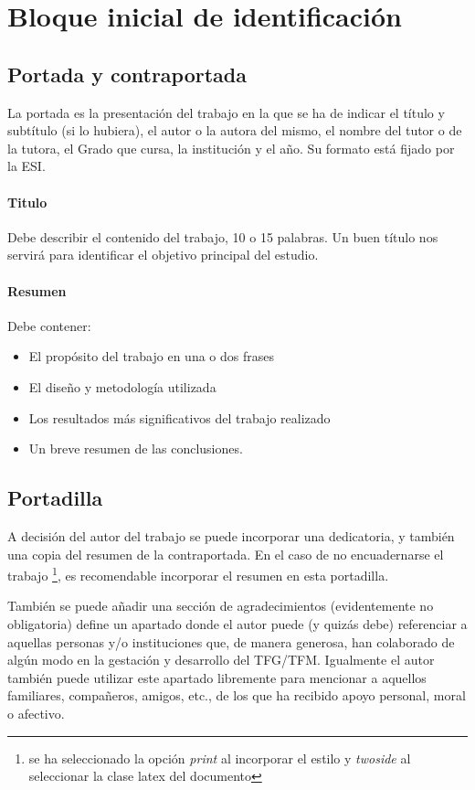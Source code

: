  \section{Bloque inicial de identificación}

 \subsection{Portada y contraportada}  
La portada es la presentación del trabajo en la que se ha de indicar el título y subtítulo (si  lo  hubiera),  el  autor  o  la  autora  del  mismo,  el  nombre  del  tutor  o  de  la  tutora,  el  Grado  que  cursa, la institución y el año. Su formato está fijado por la ESI.


\paragraph{Titulo}

Debe describir el contenido del trabajo, 10 o 15 palabras. Un buen título nos servirá para identificar el objetivo principal del estudio.

\paragraph{Resumen }
Debe contener:
\begin{itemize}
    \item El  propósito  del  trabajo  en  una  o  dos  frases
    \item El  diseño  y metodología  utilizada
    \item Los  resultados  más  significativos  del trabajo realizado 
    \item Un breve resumen de las conclusiones.
\end{itemize}


 \subsection{Portadilla}
A decisión del autor del trabajo se puede incorporar una dedicatoria, y también una copia del resumen de la contraportada. En el caso de no encuadernarse el trabajo \footnote{se ha seleccionado la opción \emph{print} al incorporar el estilo y \emph{twoside} al seleccionar la clase latex del documento}, es recomendable incorporar el resumen en esta portadilla.

También se puede añadir una  sección  de  agradecimientos  (evidentemente  no  obligatoria)  define  un apartado  donde  el autor  puede  (y  quizás  debe)  referenciar  a  aquellas  personas  y/o  instituciones  que,  de  manera generosa, han colaborado de algún modo en la gestación y desarrollo del TFG/TFM.
Igualmente el autor también  puede  utilizar  este  apartado libremente  para mencionar  a  aquellos  familiares,  compañeros, amigos, etc., de los que ha recibido apoyo personal, moral o afectivo. 

